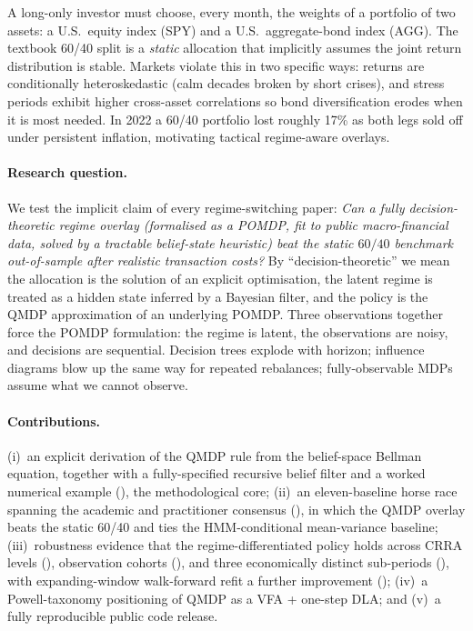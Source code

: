\documentclass[11pt]{article}
\theoremstyle{plain1}
\theoremstyle{definition1}
\newcommand{\1}{\mathbf{1}}
\begin{document}
A long-only investor must choose, every month, the weights of a portfolio of two assets: a U.S.\ equity index (SPY) and a U.S.\ aggregate-bond index (AGG). The textbook 60/40 split is a \emph{static} allocation that implicitly assumes the joint return distribution is stable. Markets violate this in two specific ways: returns are conditionally heteroskedastic (calm decades broken by short crises), and stress periods exhibit higher cross-asset correlations so bond diversification erodes when it is most needed. In 2022 a 60/40 portfolio lost roughly 17\% as both legs sold off under persistent inflation, motivating tactical regime-aware overlays.

\paragraph{Research question.} We test the implicit claim of every regime-switching paper: \emph{Can a fully decision-theoretic regime overlay (formalised as a POMDP, fit to public macro-financial data, solved by a tractable belief-state heuristic) beat the static $60/40$ benchmark out-of-sample after realistic transaction costs?} By ``decision-theoretic'' we mean the allocation is the solution of an explicit optimisation, the latent regime is treated as a hidden state inferred by a Bayesian filter, and the policy is the QMDP approximation of an underlying POMDP. Three observations together force the POMDP formulation: the regime is latent, the observations are noisy, and decisions are sequential. Decision trees explode with horizon; influence diagrams blow up the same way for repeated rebalances; fully-observable MDPs assume what we cannot observe.

\paragraph{Contributions.} (i)~an explicit derivation of the QMDP rule from the belief-space Bellman equation, together with a fully-specified recursive belief filter and a worked numerical example (), the methodological core; (ii)~an eleven-baseline horse race spanning the academic and practitioner consensus (), in which the QMDP overlay beats the static 60/40 and ties the HMM-conditional mean-variance baseline; (iii)~robustness evidence that the regime-differentiated policy holds across CRRA levels (), observation cohorts (), and three economically distinct sub-periods (), with expanding-window walk-forward refit \cite{nystrup2018} a further improvement (); (iv)~a Powell-taxonomy positioning of QMDP as a VFA + one-step DLA; and (v)~a fully reproducible public code release.
\end{document}
